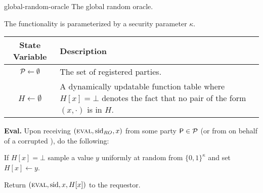 \begin{cccFunctionality}
    {\funcGRO}
    {global-random-oracle}
    {The global random oracle.}

    The functionality is parameterized by a security parameter $\kappa$.

    \addtocounter{table}{-1}
    \begin{tabularx}{.9\textwidth}{c  X}
        \toprule[.3mm]
        \textbf{State Variable}
         & \textbf{Description}
        \\ \midrule[.3mm]
        $\mathcal{P} \gets \emptyset$
         & The set of registered parties.
        \\ \midrule
        $H \gets \emptyset$
         & A dynamically updatable function table where $H[x] = \bot$ denotes the fact that no pair of the form $(x, \cdot)$ is in $H$.
        \\ \bottomrule[.3mm]
    \end{tabularx}

    \begin{cccItemize}[noitemsep]
        \item \textbf{Eval.} Upon receiving $(\textsc{eval}, \mathrm{sid}_{RO}, x)$ from some party $\mathsf{P} \in \mathcal{P}$ (or from \adv on behalf of a corrupted \party), do the following:
        \begin{cccEnum}[nosep]
            \item If $H[x] = \bot$ sample a value $y$ uniformly at random from $\{0, 1\}^\kappa$ and set $H[x] \gets y$.
            \item Return $(\textsc{eval}, \mathrm{sid}, x, H[x])$ to the requestor.
        \end{cccEnum}
    \end{cccItemize}
\end{cccFunctionality}